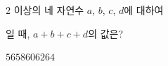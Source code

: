 $2$ 이상의 네 자연수 $a$, $b$, $c$, $d$에 대하여\par\smallskip{}\par\smallskip\noindent 일 때, $a+b+c+d$의 값은?
\begin{choices32}{$56$}{$58$}{$60$}{$62$}{$64$}\end{choices32}

